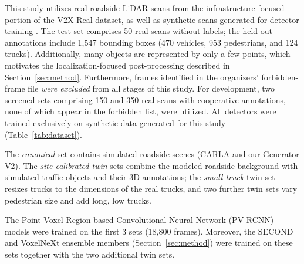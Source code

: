 \documentclass[conference]{IEEEtran}
\begin{document}
This study utilizes real roadside LiDAR scans from the infrastructure-focused portion of the V2X-Real dataset, as well as synthetic scans generated for detector training \cite{xiang2024v2xreal}.
The test set comprises 50 real scans without labels; the held-out annotations include 1,547 bounding boxes (470 vehicles, 953 pedestrians, and 124 trucks). Additionally, many objects are represented by only a few points, which motivates the localization-focused post-processing described in Section~\ref{sec:method}.
Furthermore, frames identified in the organizers' forbidden-frame file \textit{were excluded} from all stages of this study. For development, two screened sets comprising 150 and 350 real scans with cooperative annotations, none of which appear in the forbidden list, were utilized.
All detectors were trained exclusively on synthetic data generated for this study (Table~\ref{tab:dataset}).

The \emph{canonical} set contains simulated roadside scenes (CARLA and our Generator V2).  The \emph{site-calibrated twin} sets combine the modeled roadside background with simulated traffic objects and their 3D annotations; the \emph{small-truck} twin set resizes trucks to the dimensions of the real trucks, and two further twin sets vary pedestrian size and add long, low trucks.

The Point-Voxel Region-based Convolutional Neural Network (PV-RCNN) models were trained on the first 3 sets (18,800 frames). Moreover, the SECOND and VoxelNeXt ensemble members (Section~\ref{sec:method}) were trained on these sets together with the two additional twin sets.
\end{document}
